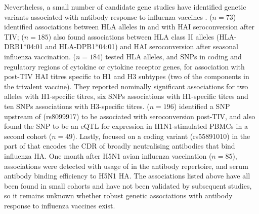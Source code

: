Nevertheless, a small number of candidate gene studies have identified genetic variants associated with antibody response to influenza vaccines \autocite{linnik2016ImpactHostGenetic}.
\textcite{gelder2002AssociationsHumanLeukocyte} ($n=73$) identified associations between \gls{HLA} alleles in  and  with \gls{HAI} seroconversion after \gls{TIV};
\textcite{moss2013CorrelationHumanLeukocyte} ($n=185$) also found associations between \gls{HLA} class II alleles (HLA-DRB1*04:01 and HLA-DPB1*04:01) and \gls{HAI} seroconversion after seasonal influenza vaccination.
\textcite{poland2008ImmunogeneticsSeasonalInfluenza} ($n=184$) tested HLA alleles, and \glspl{SNP} in coding and regulatory regions of cytokine or cytokine receptor genes, for association with post-\gls{TIV} \gls{HAI} titres specific to H1 and H3 subtypes (two of the components in the trivalent vaccine).
They reported nominally significant associations for two  alleles with H1-specific titres,
six \glspl{SNP} associations with H1-specific titres
and ten \glspl{SNP} associations with H3-specific titres.
\textcite{egli2014IL28BKeyRegulator} ($n=196$) identified a \gls{SNP} upstream of  (rs8099917) to be associated with seroconversion post-\gls{TIV},
and also found the \gls{SNP} to be an \gls{eQTL} for  expression in H1N1-stimulated \glspl{PBMC} in a second cohort ($n=49$).
Lastly, \textcite{avnir2016IGHV169PolymorphismModulates} focused on a coding variant (rs55891010) in the part of  that encodes the \gls{CDR} of broadly neutralising antibodies that bind influenza \gls{HA}.
One month after H5N1 avian influenza vaccination ($n=85$), associations were detected with usage of  in the antibody repertoire,
and serum antibody binding efficiency to H5N1 \gls{HA}.
The associations listed above have all been found in small cohorts and have not been validated by subsequent studies,
so it remains unknown whether robust genetic associations with antibody response to influenza vaccines exist.

%

